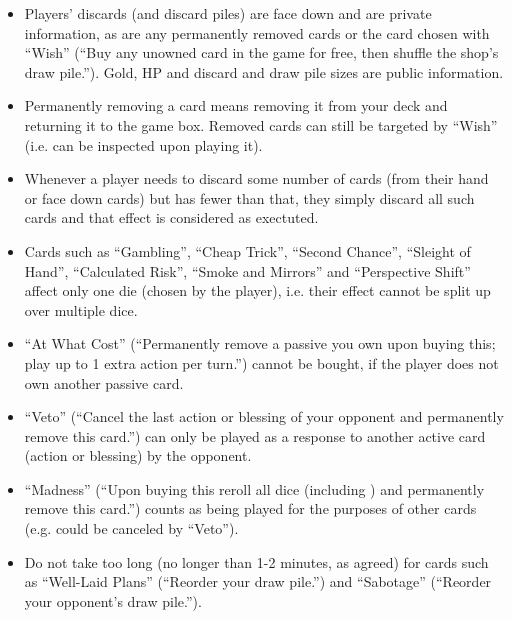 \documentclass[dvipsnames,parskip,a4paper]{scrartcl}
\newcommand{\iconsize}{3.4mm}
\newcommand{\icondepth}{0.45mm}
\newcommand{\icon}[1]{\raisebox{-\icondepth}{\texttt{[image:  \#1 ]}}}
\newcommand{\chance}{\icon{icons/chance.png}}
\begin{document}
\begin{itemize}
\item Players' discards (and discard piles) are face down and are private information, as are any permanently removed cards or the card chosen with ``Wish'' (``Buy any unowned card in the game for free, then shuffle the shop's draw pile.''). Gold, HP and discard and draw pile sizes are public information.
\item Permanently removing a card means removing it from your deck and returning it to the game box. Removed cards can still be targeted by ``Wish'' (i.e. can be inspected upon playing it). 
\item Whenever a player needs to discard some number of cards (from their hand or face down cards) but has fewer than that, they simply discard all such cards and that effect is considered as exectuted.
\item Cards such as ``Gambling'', ``Cheap Trick'', ``Second Chance'', ``Sleight of Hand'', ``Calculated Risk'', ``Smoke and Mirrors'' and ``Perspective Shift'' affect only one die (chosen by the player), i.e. their effect cannot be split up over multiple dice.
\item ``At What Cost'' (``Permanently remove a passive you own upon buying this; play up to 1 extra action per turn.'') cannot be bought, if the player does not own another passive card.
\item ``Veto'' (``Cancel the last action or blessing of your opponent and permanently remove this card.'') can only be played as a response to another active card (action or blessing) by the opponent.
\item ``Madness'' (``Upon buying this reroll all dice (including \chance) and permanently remove this card.'') counts as being played for the purposes of other cards (e.g. could be canceled by ``Veto''). 
\item Do not take too long (no longer than 1-2 minutes, as agreed) for cards such as ``Well-Laid Plans'' (``Reorder your draw pile.'') and ``Sabotage'' (``Reorder your opponent's draw pile.'').
\end{itemize}

\newpage
\end{document}
